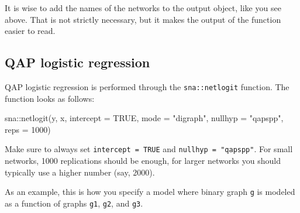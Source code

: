 \documentclass[
]{article}
\newenvironment{Shaded}{\begin{snugshade}}{\end{snugshade}}
\newcommand{\AttributeTok}[1]{\textcolor[rgb]{0.77,0.63,0.00}{#1}}
\newcommand{\ConstantTok}[1]{\textcolor[rgb]{0.00,0.00,0.00}{#1}}
\newcommand{\DecValTok}[1]{\textcolor[rgb]{0.00,0.00,0.81}{#1}}
\newcommand{\FunctionTok}[1]{\textcolor[rgb]{0.00,0.00,0.00}{#1}}
\newcommand{\NormalTok}[1]{#1}
\newcommand{\OtherTok}[1]{\textcolor[rgb]{0.56,0.35,0.01}{#1}}
\newcommand{\SpecialCharTok}[1]{\textcolor[rgb]{0.00,0.00,0.00}{#1}}
\newcommand{\StringTok}[1]{\textcolor[rgb]{0.31,0.60,0.02}{#1}}
\begin{document}
It is wise to add the names of the networks to the output object, like
you see above. That is not strictly necessary, but it makes the output
of the function easier to read.

\hypertarget{qap-logistic-regression}{%
\subsection{QAP logistic regression}\label{qap-logistic-regression}}

QAP logistic regression is performed through the \texttt{sna::netlogit}
function. The function looks as follows:

\begin{Shaded}
\begin{Highlighting}[]
\NormalTok{sna}\SpecialCharTok{::}\FunctionTok{netlogit}\NormalTok{(y, x, }\AttributeTok{intercept =} \ConstantTok{TRUE}\NormalTok{, }\AttributeTok{mode =} \StringTok{"digraph"}\NormalTok{,}
    \AttributeTok{nullhyp =} \StringTok{"qapspp"}\NormalTok{, }\AttributeTok{reps =} \DecValTok{1000}\NormalTok{)}
\end{Highlighting}
\end{Shaded}

Make sure to always set \texttt{intercept\ =\ TRUE} and
\texttt{nullhyp\ =\ "qapspp"}. For small networks, 1000 replications
should be enough, for larger networks you should typically use a higher
number (say, 2000).

As an example, this is how you specify a model where binary graph
\texttt{g} is modeled as a function of graphs \texttt{g1}, \texttt{g2},
and \texttt{g3}.

\begin{Shaded}
\end{Shaded}
\end{document}
